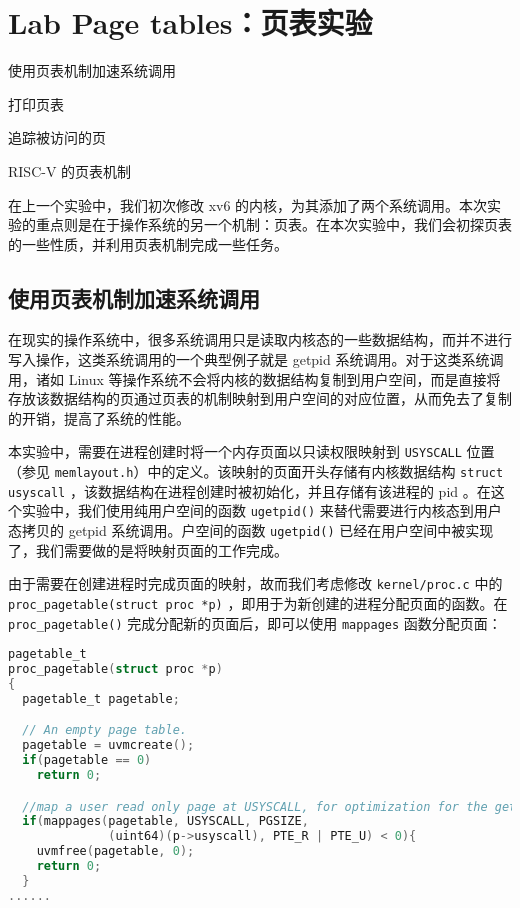 \chapter{Lab Page tables：页表实验}
\begin{introduction}
    \item 使用页表机制加速系统调用
    \item 打印页表
    \item 追踪被访问的页
    \item RISC-V 的页表机制
\end{introduction}

在上一个实验中，我们初次修改 xv6 的内核，为其添加了两个系统调用。本次实验的重点则是在于操作系统的另一个机制：页表。在本次实验中，我们会初探页表的一些性质，并利用页表机制完成一些任务。

\section{使用页表机制加速系统调用}

在现实的操作系统中，很多系统调用只是读取内核态的一些数据结构，而并不进行写入操作，这类系统调用的一个典型例子就是 getpid 系统调用。对于这类系统调用，诸如 Linux 等操作系统不会将内核的数据结构复制到用户空间，而是直接将存放该数据结构的页通过页表的机制映射到用户空间的对应位置，从而免去了复制的开销，提高了系统的性能。

本实验中，需要在进程创建时将一个内存页面以只读权限映射到 \lstinline{USYSCALL} 位置（参见 \lstinline{memlayout.h}）中的定义。该映射的页面开头存储有内核数据结构 \lstinline{struct usyscall} ，该数据结构在进程创建时被初始化，并且存储有该进程的 pid 。在这个实验中，我们使用纯用户空间的函数 \lstinline{ugetpid()} 来替代需要进行内核态到用户态拷贝的 getpid 系统调用。户空间的函数 \lstinline{ugetpid()} 已经在用户空间中被实现了，我们需要做的是将映射页面的工作完成。

由于需要在创建进程时完成页面的映射，故而我们考虑修改 \lstinline{kernel/proc.c} 中的 \lstinline{proc_pagetable(struct proc *p)} ，即用于为新创建的进程分配页面的函数。在 \lstinline{proc_pagetable()} 完成分配新的页面后，即可以使用 \lstinline{mappages} 函数分配页面：
\begin{lstlisting}[language=C]
pagetable_t
proc_pagetable(struct proc *p)
{
  pagetable_t pagetable;

  // An empty page table.
  pagetable = uvmcreate();
  if(pagetable == 0)
    return 0;

  //map a user read only page at USYSCALL, for optimization for the getpid()
  if(mappages(pagetable, USYSCALL, PGSIZE,
              (uint64)(p->usyscall), PTE_R | PTE_U) < 0){
    uvmfree(pagetable, 0);
    return 0;
  }
......
\end{lstlisting}

